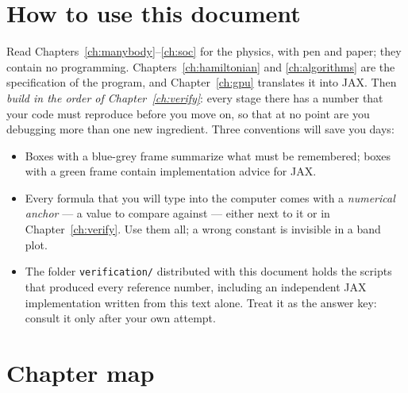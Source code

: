 \section{How to use this document}

Read Chapters~\ref{ch:manybody}--\ref{ch:soc} for the physics, with pen and
paper; they contain no programming. Chapters~\ref{ch:hamiltonian} and
\ref{ch:algorithms} are the specification of the program, and
Chapter~\ref{ch:gpu} translates it into JAX. Then \emph{build in the order
of Chapter~\ref{ch:verify}}: every stage there has a number that your code
must reproduce before you move on, so that at no point are you debugging
more than one new ingredient. Three conventions will save you days:
\begin{itemize}[leftmargin=2em]
\item Boxes with a blue-grey frame summarize what must be remembered; boxes
with a green frame contain implementation advice for JAX.
\item Every formula that you will type into the computer comes with a
\emph{numerical anchor} --- a value to compare against --- either next to it
or in Chapter~\ref{ch:verify}. Use them all; a wrong constant is invisible
in a band plot.
\item The folder \texttt{verification/} distributed with this document
holds the scripts that produced every reference number, including an
independent JAX implementation written from this text alone. Treat it as
the answer key: consult it only after your own attempt.
\end{itemize}

\section{Chapter map}

